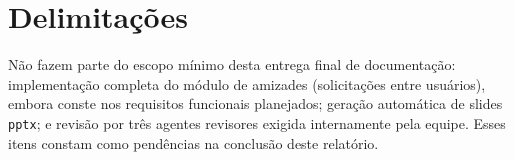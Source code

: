 \section{Delimitações}

Não fazem parte do escopo mínimo desta entrega final de documentação: implementação completa do módulo de amizades (solicitações entre usuários), embora conste nos requisitos funcionais planejados; geração automática de slides \texttt{pptx}; e revisão por três agentes revisores exigida internamente pela equipe. Esses itens constam como pendências na conclusão deste relatório.
